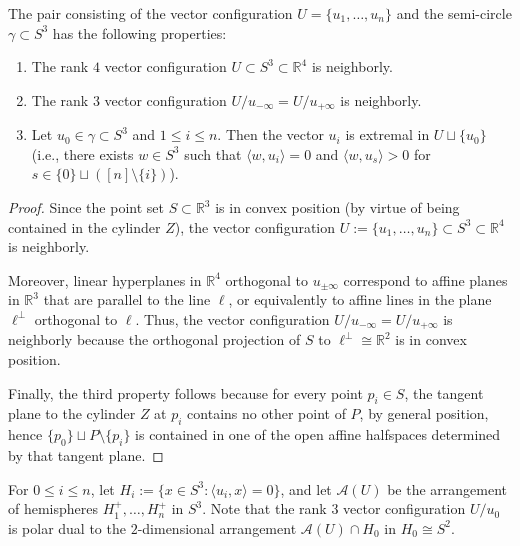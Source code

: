 \documentclass[a4paper,USenglish,cleveref, autoref, thm-restate,nolineno]{socg-lipics-v2021}
\renewcommand{\leq}{\leqslant}
\newcommand{\R}{\mathbb{R}}
\begin{document}
\begin{lemma} 
\label{lem:special}
The pair consisting of the vector configuration $U=\{u_1,\dots,u_n\}$ and the semi-circle $\gamma\subset S^3$ has the following properties:
\begin{enumerate}
\item The rank $4$ vector configuration $U \subset S^3 \subset \R^4$ is neighborly.
\item The rank $3$ vector configuration $U/u_{-\infty}=U/u_{+\infty}$ is neighborly.
\item Let $u_0 \in \gamma \subset S^3$ and $1\leq i \leq n$. Then the vector $u_i$ is extremal in $U \sqcup \{ u_0 \}$ (i.e., there exists $w\in S^3$ such that $\langle w,u_i\rangle =0$ and $\langle w,u_s\rangle > 0$ for $s\in \{0\}\sqcup ([n]\setminus \{i\})$). 
\end{enumerate}
\end{lemma}
\begin{proof} Since the point set $S\subset \R^3$ is in convex position (by virtue of being contained in the cylinder $Z$), the vector configuration $U:=\{u_1,\dots,u_n\} \subset S^3 \subset \R^4$ is neighborly. 

Moreover, linear hyperplanes in $\R^4$ orthogonal to $u_{\pm \infty}$ correspond to affine planes in $\R^3$ that are parallel to the line $\ell$, or equivalently to affine lines in the plane $\ell^\bot$ orthogonal to $\ell$. Thus, the vector configuration $U/u_{-\infty}=U/u_{+\infty}$ is neighborly because the orthogonal projection of $S$ to $\ell^\bot\cong \R^2$ is in convex position. 

Finally, the third property follows because for every point $p_i \in S$, the tangent plane to the cylinder $Z$ at $p_i$ contains no other point of $P$, by general position, hence $\{p_0\}\sqcup P\setminus\{p_i\}$ is contained in one of the open affine halfspaces determined by that tangent plane.
\end{proof}
For $0\leq i \leq n$, let $H_i:=\{x\in S^3\colon \langle u_i,x\rangle =0\}$, and let $\mathcal{A}(U)$ be the arrangement of hemispheres $H_1^+,\dots, H_n^+$ in $S^3$. Note that the rank $3$ vector configuration $U/u_0$ is polar dual to the $2$-dimensional arrangement $\mathcal{A}(U)\cap H_0$ in $H_0 \cong S^2$.
\end{document}
